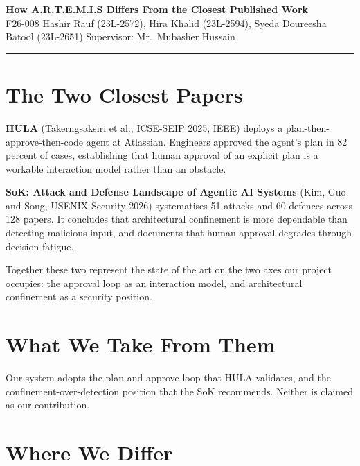 \documentclass[11pt,a4paper]{article}
\begin{document}
\begin{center}
{\large\bfseries How A.R.T.E.M.I.S Differs From the Closest Published Work}\\[0.3em]
{\small F26-008 \textbar{} Hashir Rauf (23L-2572), Hira Khalid (23L-2594),
Syeda Doureesha Batool (23L-2651) \textbar{} Supervisor: Mr.\ Mubasher Hussain}
\end{center}
\vspace{-0.4em}
\hrule
\vspace{0.6em}

\section{The Two Closest Papers}

\textbf{HULA} (Takerngsaksiri et al., ICSE-SEIP 2025, IEEE) deploys a
plan-then-approve-then-code agent at Atlassian. Engineers approved the agent's
plan in 82 percent of cases, establishing that human approval of an explicit
plan is a workable interaction model rather than an obstacle.

\textbf{SoK: Attack and Defense Landscape of Agentic AI Systems} (Kim, Guo and
Song, USENIX Security 2026) systematises 51 attacks and 60 defences across 128
papers. It concludes that architectural confinement is more dependable than
detecting malicious input, and documents that human approval degrades through
decision fatigue.

Together these two represent the state of the art on the two axes our project
occupies: the approval loop as an interaction model, and architectural
confinement as a security position.

\section{What We Take From Them}

Our system adopts the plan-and-approve loop that HULA validates, and the
confinement-over-detection position that the SoK recommends. Neither is claimed
as our contribution.

\section{Where We Differ}
\end{document}
